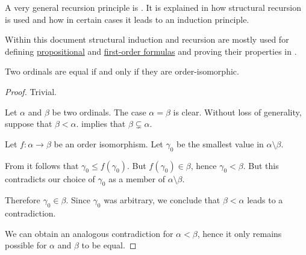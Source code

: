 \begin{remark}
\begin{thmenum}
     A very general recursion principle is . It is explained in  how structural recursion is used and how in certain cases it leads to an induction principle.

    Within this document structural induction and recursion are mostly used for defining \hyperref[def:propositional_syntax/formula]{propositional} and \hyperref[def:first_order_syntax/formula]{first-order formulas} and proving their properties in .
  \end{thmenum}
\end{remark}

\begin{proposition}\label{thm:ordinal_isomorphism}
  Two ordinals are equal if and only if they are order-isomorphic.
\end{proposition}
\begin{proof}
  \SufficiencySubProof Trivial.

  \NecessitySubProof Let \( \alpha \) and \( \beta \) be two ordinals. The case \( \alpha = \beta \) is clear. Without loss of generality, suppose that \( \beta < \alpha \).  implies that \( \beta \subsetneq \alpha \).

  Let \( f: \alpha \to \beta \) be an order isomorphism. Let \( \gamma_0 \) be the smallest value in \( \alpha \setminus \beta \).

  From  it follows that \( \gamma_0 \leq f(\gamma_0) \). But \( f(\gamma_0) \in \beta \), hence \( \gamma_0 < \beta \). But this contradicts our choice of \( \gamma_0 \) as a member of \( \alpha \setminus \beta \).

  Therefore \( \gamma_0 \in \beta \). Since \( \gamma_0 \) was arbitrary, we conclude that \( \beta < \alpha \) leads to a contradiction.

  We can obtain an analogous contradiction for \( \alpha < \beta \), hence it only remains possible for \( \alpha \) and \( \beta \) to be equal.
\end{proof}

